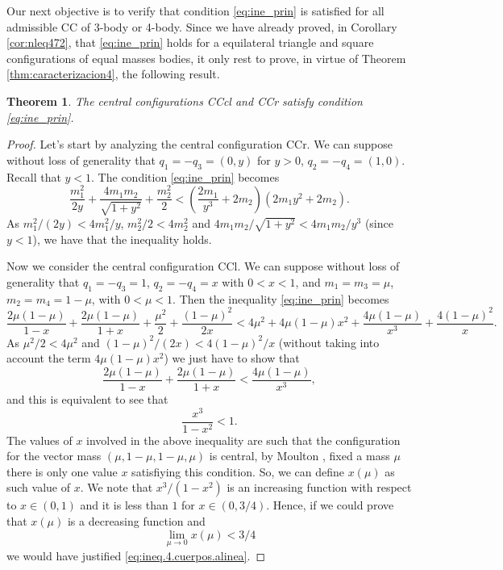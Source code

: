 \documentclass[twoside]{article}
\newtheorem{thm}{Theorem}[section]
\theoremstyle{remark}
\begin{document}
Our next objective is to verify that condition \eqref{eq:ine_prin} is satisfied for all admissible CC of 3-body or 4-body. Since we have already proved, in  Corollary \ref{cor:nleq472}, that \eqref{eq:ine_prin} holds for a equilateral triangle and square configurations of equal masses bodies, it only rest to prove, in virtue of Theorem \ref{thm:caracterizacion4}, the following result.



\begin{thm}\label{thm:CC.3.4.satis.cond.adm}
The central configurations CCcl and CCr satisfy condition \eqref{eq:ine_prin}.
\end{thm}



\begin{proof}

Let's start by analyzing the central configuration CCr. We can suppose without loss of generality that $ q_1 = -q_3 = (0, y) $ for $ y> 0 $, $ q_2 = -q_4 = (1,0) $. Recall that $ y <1 $. The condition \eqref{eq:ine_prin} becomes
\[\frac{m_1^2}{2y}+\frac{4m_1m_2}{\sqrt{1+y^2}}+\frac{m_2^2}{2}<\left(\frac{2m_1}{y^3}+2m_2\right) \left(2m_1y^2+2m_2\right).\]
As $m_1^2/(2y)<4m_1^2/y$, $m_2^2/2<4m_2^2$ and $4m_1m_2/\sqrt{1+y^2}<4m_1m_2/y^3$ (since $y<1$), we have that the inequality holds.

 Now we consider the central configuration CCl.  We can suppose without loss of generality that $q_1=-q_3=1$, $q_2=-q_4=x$ with $0<x<1$, and $m_1=m_3=\mu$, $m_2=m_4=1-\mu$, with $0<\mu<1$.  Then the inequality \eqref{eq:ine_prin} becomes
\[\frac{2\mu(1-\mu)}{1-x} +\frac{2\mu(1-\mu)}{1+x}+\frac{\mu^2}{2}+\frac{(1-\mu)^2}{2x}<4\mu^2+4\mu(1-\mu)x^2+\frac{4\mu(1-\mu)}{x^3}+\frac{4(1-\mu)^2}{x}.\]
As $ \mu ^ 2/2 <4 \mu^2$ and $ (1-\mu)^2/(2x)< 4(1-\mu)^2/x $ (without taking into account the term $4\mu(1- \mu)x^2$) we just have to show that
\[\frac{2\mu(1-\mu)}{1-x} +\frac{2\mu(1-\mu)}{1+x}<\frac{4\mu(1-\mu)}{x^3},\]
and this is equivalent to see that
\begin{equation}\label{eq:ineq.4.cuerpos.alinea}
\frac{x^3}{1-x^2}<1.
\end{equation}
The values of $x$ involved in the above inequality are such that the configuration for the vector mass $(\mu,1-\mu,1-\mu,\mu)$ is central, by Moulton \cite{moulton1910straight}, fixed a mass $\mu$ there is only one value $x$ satisfiying this condition. So, we can define $x(\mu)$ as such value of $x$.  We note that $x^3/(1-x^2)$ is an increasing function with respect to $x\in (0,1)$ and it is less than $1$ for $x\in (0,3/4)$. Hence, if we could prove that $x(\mu)$ is a decreasing function and
\begin{equation}\label{eq:ineq.4.cuerpos.lim0}
\lim\limits_{\mu\to 0}x(\mu)<3/4
\end{equation}
we would have justified \eqref {eq:ineq.4.cuerpos.alinea}.


\end{proof}
\end{document}
